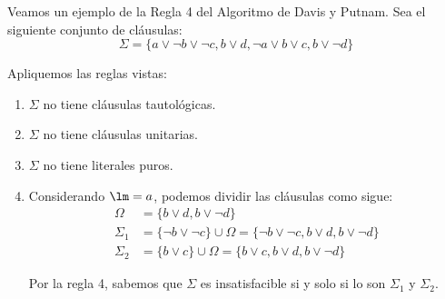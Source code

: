 \begin{ejemplo}
    Veamos un ejemplo de la Regla 4 del Algoritmo de Davis y Putnam.
    Sea el siguiente conjunto de cláusulas:
    \begin{equation*}
        \Sigma = \{a\lor \lnot b\lor \lnot c, b\lor d,\lnot a\lor b\lor c,b\lor \lnot d\}
    \end{equation*}

    Apliquemos las reglas vistas:
    \begin{enumerate}
        \item $\Sigma$ no tiene cláusulas tautológicas.
        \item $\Sigma$ no tiene cláusulas unitarias.
        \item $\Sigma$ no tiene literales puros.
        \item Considerando $\lm=a$, podemos dividir las cláusulas como sigue:
        \begin{align*}
            \Omega &= \{b\lor d,b\lor \lnot d\}\\
            \Sigma_1 &= \{\lnot b\lor \lnot c\} \cup \Omega = \{\lnot b\lor \lnot c,b\lor d,b\lor \lnot d\}\\
            \Sigma_2 &= \{b\lor c\} \cup \Omega = \{b\lor c,b\lor d,b\lor \lnot d\}
        \end{align*}

        Por la regla 4, sabemos que $\Sigma$ es insatisfacible si y solo si lo son $\Sigma_1$ y $\Sigma_2$.
    \end{enumerate}
\end{ejemplo}

